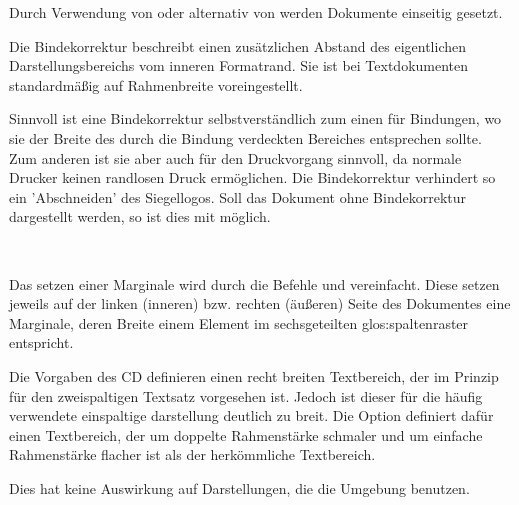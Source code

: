 Durch Verwendung von  oder alternativ
von  werden Dokumente einseitig gesetzt.

\begin{Declaration}
\end{Declaration}

Die Bindekorrektur beschreibt einen zusätzlichen Abstand des eigentlichen
Darstellungsbereichs vom inneren Formatrand.
Sie ist bei Textdokumenten standardmäßig auf Rahmenbreite voreingestellt.

Sinnvoll ist eine Bindekorrektur selbstverständlich zum einen für Bindungen,
wo sie der Breite des durch die Bindung verdeckten Bereiches entsprechen sollte.
Zum anderen ist sie aber auch für den Druckvorgang sinnvoll, da normale Drucker
keinen randlosen Druck ermöglichen.
Die Bindekorrektur verhindert so \zB ein 'Abschneiden' des Siegellogos.
Soll das Dokument ohne Bindekorrektur dargestellt werden, so ist dies
mit  möglich.


\begin{Declaration}
  \\
\end{Declaration}

Das setzen einer Marginale wird durch die Befehle  und
 vereinfacht. Diese setzen jeweils auf der linken (inneren)
bzw. rechten (äußeren) Seite des Dokumentes eine Marginale, deren Breite
einem Element im sechsgeteilten \gls{glos:spaltenraster} entspricht.

\begin{Declaration}
\end{Declaration}%

Die Vorgaben des CD definieren einen recht breiten Textbereich, der im Prinzip
für den zweispaltigen Textsatz vorgesehen ist. Jedoch ist dieser für die häufig
verwendete einspaltige darstellung deutlich zu breit.
Die Option  definiert dafür einen Textbereich, der um
doppelte Rahmenstärke schmaler und um einfache Rahmenstärke flacher
ist als der herkömmliche Textbereich.
\begin{important}
Dies hat keine Auswirkung auf Darstellungen, die die Umgebung
 benutzen.
\end{important}

